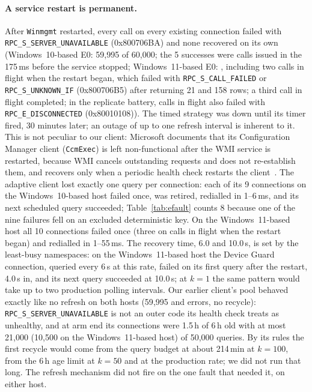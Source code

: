 \documentclass[letterpaper,twocolumn,10pt]{article}
\newcommand{\code}[1]{\texttt{\small #1}}
\newcommand{\hr}[1]{\texttt{\small #1}}
\begin{document}
\paragraph{A service restart is permanent.}
After \code{Winmgmt} restarted, every call on every existing connection failed with \hr{RPC\_S\_SERVER\_UNAVAILABLE} (0x800706BA) and none recovered on its own (Windows~10-based E0: 59{,}995 of 60{,}000; the 5 successes were calls issued in the 175\,ms before the service stopped; Windows~11-based E0: \EbZeroErr{}, including two calls in flight when the restart began, which failed with \hr{RPC\_S\_CALL\_FAILED} or \hr{RPC\_S\_UNKNOWN\_IF} (0x800706B5) after returning 21 and 158 rows; a third call in flight completed; in the replicate battery, calls in flight also failed with \hr{RPC\_E\_DISCONNECTED} (0x80010108)).
The timed strategy was down until its timer fired, 30 minutes later; an outage of up to one refresh interval is inherent to it.
This is not peculiar to our client: Microsoft documents that its Configuration Manager client (\code{CcmExec}) is left non-functional after the WMI service is restarted, because WMI cancels outstanding requests and does not re-establish them, and recovers only when a periodic health check restarts the client~\cite{ms-ccmexec}.
The adaptive client lost exactly one query per connection: each of its 9 connections on the Windows~10-based host failed once, was retired, redialled in 1--6\,ms, and its next scheduled query succeeded; Table~\ref{tab:efault} counts 8 because one of the nine failures fell on an excluded deterministic key.
On the Windows~11-based host all 10 connections failed once (three on calls in flight when the restart began) and redialled in 1--55\,ms.
The recovery time, 6.0 and 10.0\,s, is set by the least-busy namespaces: on the Windows~11-based host the Device Guard connection, queried every 6\,s at this rate, failed on its first query after the restart, 4.0\,s in, and its next query succeeded at 10.0\,s; at $k=1$ the same pattern would take up to two production polling intervals.
Our earlier client's pool behaved exactly like no refresh on both hosts (59{,}995 and \EbThreeErr{} errors, no recycle): \hr{RPC\_S\_SERVER\_UNAVAILABLE} is not an outer code its health check treats as unhealthy, and at arm end its connections were 1.5\,h of 6\,h old with at most 21{,}000 (10{,}500 on the Windows~11-based host) of 50{,}000 queries.
By its rules the first recycle would come from the query budget at about 214\,min at $k=100$, from the 6\,h age limit at $k=50$ and at the production rate; we did not run that long.
The refresh mechanism did not fire on the one fault that needed it, on either host.
\end{document}
